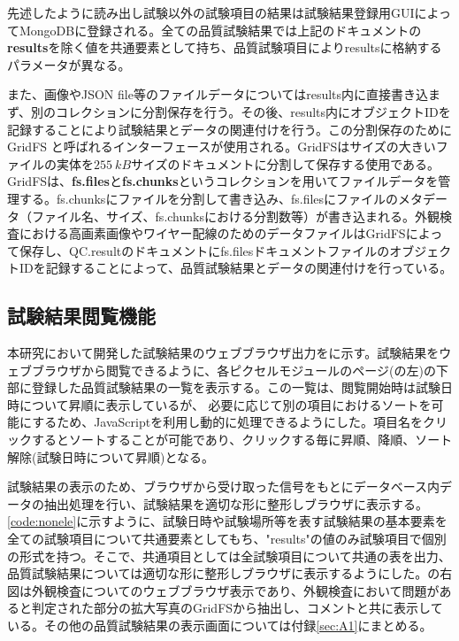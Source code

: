 先述したように読み出し試験以外の試験項目の結果は試験結果登録用GUIによってMongoDBに登録される。全ての品質試験結果では上記のドキュメントの\textbf{results}を除く値を共通要素として持ち、品質試験項目によりresultsに格納するパラメータが異なる。

また、画像やJSON file等のファイルデータについてはresults内に直接書き込まず、別のコレクションに分割保存を行う。その後、results内にオブジェクトIDを記録することにより試験結果とデータの関連付けを行う。この分割保存のためにGridFS \cite{mongo}と呼ばれるインターフェースが使用される。GridFSはサイズの大きいファイルの実体を$255\ \si{kB}$サイズのドキュメントに分割して保存する使用である。GridFSは、\textbf{fs.files}と\textbf{fs.chunks}というコレクションを用いてファイルデータを管理する。fs.chunksにファイルを分割して書き込み、fs.filesにファイルのメタデータ（ファイル名、サイズ、fs.chunksにおける分割数等）が書き込まれる。外観検査における高画素画像やワイヤー配線のためのデータファイルはGridFSによって保存し、QC.resultのドキュメントにfs.filesドキュメントファイルのオブジェクトIDを記録することによって、品質試験結果とデータの関連付けを行っている。


\subsection{試験結果閲覧機能}
\label{sec:non-elec-view}

本研究において開発した試験結果のウェブブラウザ出力をに示す。試験結果をウェブブラウザから閲覧できるように、各ピクセルモジュールのページ(の左)の下部に登録した品質試験結果の一覧を表示する。この一覧は、閲覧開始時は試験日時について昇順に表示しているが、
必要に応じて別の項目におけるソートを可能にするため、JavaScriptを利用し動的に処理できるようにした。項目名をクリックするとソートすることが可能であり、クリックする毎に昇順、降順、ソート解除(試験日時について昇順)となる。

試験結果の表示のため、ブラウザから受け取った信号をもとにデータベース内データの抽出処理を行い、試験結果を適切な形に整形しブラウザに表示する。\cref{code:nonele}に示すように、試験日時や試験場所等を表す試験結果の基本要素を全ての試験項目について共通要素としてもち、"results"の値のみ試験項目で個別の形式を持つ。そこで、共通項目としては全試験項目について共通の表を出力、品質試験結果については適切な形に整形しブラウザに表示するようにした。の右図は外観検査についてのウェブブラウザ表示であり、外観検査において問題があると判定された部分の拡大写真のGridFSから抽出し、コメントと共に表示している。その他の品質試験結果の表示画面については付録\ref{sec:A1}にまとめる。

